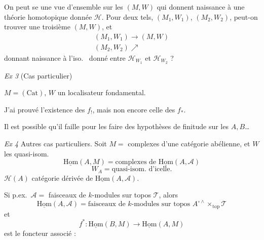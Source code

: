 \documentclass[11pt,a4paper]{article}
\begin{document}
On peut se \struck{\ill{}}  une vue d'ensemble sur
les $(M, W)$ qui donnent naissance à une théorie homotopique donnée
$\mathcal H$.  Pour deux tels, $(M_1, W_1)$,
$(M_2, W_2)$, peut-on trouver une troisième $(M, W)$, et 
\[
  \begin{array}{c}
    (M_1, W_1) \longrightarrow (M, W) \\
    (M_2, W_2) \nearrow
  \end{array}
\]
donnant naissance à l'iso.\ \struck{\ill{}} donné entre $\mathcal H_{W_1}$
et $\mathcal H_{W_2}$ ?

\emph{Ex 3} \quad (Cas particulier)

$M = (\mathrm{Cat})$, $W$ un localisateur fondamental.

J'ai prouvé l'existence des $f_!$, mais non encore celle des
$f_*$.

Il est possible qu'il faille pour les \ill{} faire des hypothèses de
finitude sur les $A, B$…

\emph{Ex 4} \quad Autres cas particuliers. Soit
$M =$ complexes d'une catégorie abélienne, et $W$ les quasi-isom.
\[
  \underline{\mathrm{Hom}}(A, M) = \text{complexes de }
  \underline{\mathrm{Hom}}(A, \mathcal A)
\]
\[
  W_A = \text{quasi-isom.\ d'icelle.}
\]
$\mathcal H(A)$ catégorie dérivée de $\underline{\mathrm{Hom}}(A, \mathcal A)$.

Si p.ex.\ $\mathcal A =$ faisceaux de $k$-modules sur topos
\struck{\ill{}} $\mathcal T$, alors
\[
  \underline{\mathrm{Hom}}(A, \mathcal A) = \text{faisceaux de $k$-modules
  sur topos } A^{\circ\wedge} \times_{\mathrm{top}} \mathcal T
\]
et
\[
  f^{*} : \underline{\mathrm{Hom}}(B, M) \to \underline{\mathrm{Hom}}(A, M)
\]
est le foncteur  associé :


\end{document}
